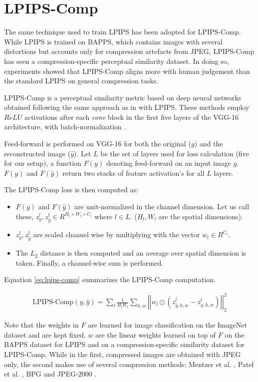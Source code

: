 \section{LPIPS-Comp}
\label{sec:lpipscomp}
The same technique used to train LPIPS has been adopted for LPIPS-Comp. While LPIPS is trained on BAPPS, which contains images with several distortions but accounts only for compression artefacts from JPEG, LPIPS-Comp has seen a compression-specific perceptual similarity dataset. In doing so, experiments showed that LPIPS-Comp aligns more with human judgement than the standard LPIPS on general compression tasks.

LPIPS-Comp \cite{patel2021saliency} is a perceptual similarity metric based on deep neural networks obtained following the same approach as in \cite{zhang2018unreasonable} with LPIPS.
These methods employ $ReLU$ activations after each \textit{conv} block in the first five layers of the VGG-16 \cite{simonyan2014very} architecture, with batch-normalization \cite{ioffe2015batch}.

Feed-forward is performed on VGG-16 for both the original ($y$) and the reconstructed image ($\hat{y}$).
Let $L$ be the set of layers used for loss calculation (five for our setup), a function $F(y)$ denoting feed-forward on an input image $y$.
$F(y)$ and $F(\hat{y})$ return two stacks of feature activation’s for all $L$ layers.

The LPIPS-Comp loss is then computed as:
\begin{itemize}
\item $F(y)$ and $F(\hat{y})$ are unit-normalized in the channel dimension. Let us call these, $z^l_y, z^l_{\hat{y}} \in R^{H_l \times W_l \times C_l}$ where $l \in L$. ($H_l, W_l$ are the spatial dimensions).
\item $z^l_y , z^l_{\hat{y}}$ are scaled channel wise by multiplying with the vector $w_l \in R^{C_l}$.
\item The $L_2$ distance is then computed and an average over spatial dimension is taken. Finally, a channel-wise sum is performed.
\end{itemize}

Equation \ref{eq:lpips-comp} summarizes the LPIPS-Comp computation.

\begin{align}
\text{LPIPS-Comp}(y, \hat{y}) = \sum_{l} \frac{1}{H_l W_l} \sum_{h, w} \left| \left| w_l \odot \left( z^l_{\hat{y}, h, w} - z^l_{y, h, w} \right) \right| \right|^2_2\label{eq:lpips-comp}
\end{align}

Note that the weights in $F$ are learned for image classification on the ImageNet dataset \cite{russakovsky2015imagenet} and are kept fixed. $w$ are the linear weights learned on top of $F$ on the BAPPS \cite{zhang2018unreasonable} dataset for LPIPS and on a compression-specific similarity dataset for LPIPS-Comp. While in the first, compressed images are obtained with JPEG only, the second makes use of several compression methods: Mentzer et al. \cite{mentzer2018conditional}, Patel et al. \cite{patel2019deep}, BPG \cite{bellard2014bpg} and JPEG-2000 \cite{skodras2001jpeg}.
